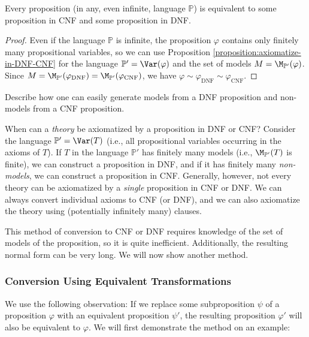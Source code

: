 \begin{corollary}
    Every proposition (in any, even infinite, language $\mathbb P$) is equivalent to some proposition in CNF and some proposition in DNF.
\end{corollary}
\begin{proof}
Even if the language $\mathbb P$ is infinite, the proposition $\varphi$ contains only finitely many propositional variables, so we can use Proposition \ref{proposition:axiomatize-in-DNF-CNF} for the language $\mathbb P' = \Var(\varphi)$ and the set of models $M = \M_{\mathbb P'}(\varphi)$. Since $M = \M_{\mathbb P'}(\varphi_{\mathrm{DNF}}) = \M_{\mathbb P'}(\varphi_{\mathrm{CNF}})$, we have $\varphi \sim \varphi_{\mathrm{DNF}} \sim \varphi_{\mathrm{CNF}}$.
\end{proof}

\begin{exercise}
Describe how one can easily generate models from a DNF proposition and non-models from a CNF proposition.
\end{exercise}

\begin{remark}
    When can a \emph{theory} be axiomatized by a proposition in DNF or CNF? Consider the language $\mathbb P' = \Var(T)$ (i.e., all propositional variables occurring in the axioms of $T$). If $T$ in the language $\mathbb P'$ has finitely many models (i.e., $\M_{\mathbb P'}(T)$ is finite), we can construct a proposition in DNF, and if it has finitely many \emph{non-models}, we can construct a proposition in CNF. Generally, however, not every theory can be axiomatized by a \emph{single} proposition in CNF or DNF. We can always convert individual axioms to CNF (or DNF), and we can also axiomatize the theory using (potentially infinitely many) clauses.
\end{remark}

This method of conversion to CNF or DNF requires knowledge of the set of models of the proposition, so it is quite inefficient. Additionally, the resulting normal form can be very long. We will now show another method.

\subsubsection{Conversion Using Equivalent Transformations}

We use the following observation: If we replace some subproposition $\psi$ of a proposition $\varphi$ with an equivalent proposition $\psi'$, the resulting proposition $\varphi'$ will also be equivalent to $\varphi$. We will first demonstrate the method on an example:

